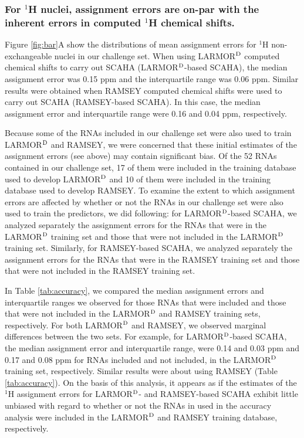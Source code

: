 \documentclass[journal=jcisd8,manuscript=article,layout=onecolumn]{achemso}
\begin{document}
\subsubsection{For $^{1}$H nuclei, assignment errors are on-par with the inherent errors in computed $^{1}$H chemical shifts.}  Figure \ref{fig:bar}A show the distributions of mean assignment errors for $^{1}$H non-exchangeable nuclei in our challenge set. When using LARMOR$^{\rm D}$ computed chemical shifts to carry out SCAHA (LARMOR$^{\rm D}$-based SCAHA), the median assignment error was 0.15 ppm and the interquartile range was 0.06 ppm. Similar results were obtained when RAMSEY computed chemical shifts were used to carry out SCAHA (RAMSEY-based SCAHA). In this case, the median assignment error and interquartile range were 0.16 and 0.04 ppm, respectively. 

Because some of the RNAs included in our challenge set were also used to train LARMOR$^{\rm D}$ and RAMSEY, we were concerned that these initial estimates of the assignment errors (see above) may contain significant bias. Of the 52 RNAs contained in our challenge set, 17 of them were included in the training database used to develop LARMOR$^{\rm D}$ and 10 of them were included in the training database used to develop RAMSEY. To examine the extent to which assignment errors are affected by whether or not the RNAs in our challenge set were also used to train the predictors, we did following: for LARMOR$^{\rm D}$-based SCAHA, we analyzed separately the assignment errors for the RNAs that were in the LARMOR$^{\rm D}$ training set and those that were not included in the LARMOR$^{\rm D}$ training set. Similarly,  for RAMSEY-based SCAHA, we analyzed separately the assignment errors for the RNAs that were in the RAMSEY training set and those that were not included in the RAMSEY training set.

In Table \ref{tab:accuracy}, we compared the median assignment errors and interquartile ranges we observed for those RNAs that were included and those that were not included in the LARMOR$^{\rm D}$ and RAMSEY training sets, respectively. For both LARMOR$^{\rm D}$ and RAMSEY, we observed marginal differences between the two sets. For example, for LARMOR$^{\rm D}$-based SCAHA,  the median assignment error and interquartile range, were 0.14 and 0.03 ppm and 0.17 and 0.08 ppm for RNAs included and not included, in the LARMOR$^{\rm D}$ training set, respectively. Similar results were about using RAMSEY (Table \ref{tab:accuracy}). On the basis of this analysis, it appears as if the estimates of the $^{1}$H assignment errors for LARMOR$^{\rm D}$- and RAMSEY-based SCAHA exhibit little unbiased with regard to  whether or not the RNAs in used in the accuracy analysis were included in the LARMOR$^{\rm D}$ and RAMSEY training database, respectively.
\end{document}
